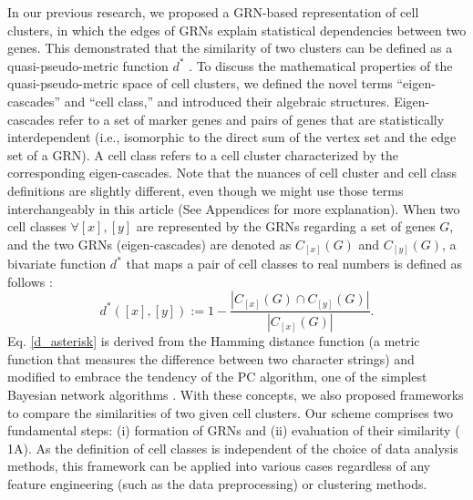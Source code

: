 \documentclass{article}
\begin{document}
In our previous research, we proposed a \ac{GRN}-based representation of cell clusters, in 
which the edges of GRNs explain statistical dependencies between two genes. This demonstrated that the similarity 
of two clusters can be defined as a quasi-pseudo-metric function $d^*$ \cite{okano2023set}. To discuss the mathematical properties of 
the quasi-pseudo-metric space of cell clusters, we defined the novel terms ``eigen-cascades'' and ``cell class,'' and 
introduced their algebraic structures. Eigen-cascades refer to a set of marker genes and pairs of genes that are 
statistically interdependent (i.e., isomorphic to the direct sum of the vertex set and the edge set of a GRN). A 
cell class refers to a cell cluster characterized by the corresponding eigen-cascades. Note that the nuances of cell 
cluster and cell class definitions are slightly different, even though we might use those terms interchangeably in this article 
(See Appendices for more explanation). When two cell classes $\forall[x], [y]$ are represented by the GRNs regarding a 
set of genes $G$, and the two GRNs (eigen-cascades) are denoted as $C_{[x]}(G)$ and $C_{[y]}(G)$, a bivariate function $d^*$ 
that maps a pair of cell classes to real numbers is defined as follows \cite{okano2023set}:
\begin{equation}\label{d_asterisk}
  d^*([x], [y]) := 1 - \frac{|C_{[x]}(G)\cap C_{[y]}(G)|}{|C_{[x]}(G)|}.
\end{equation}
Eq. \eqref{d_asterisk} is derived from the Hamming distance function (a metric function that measures the difference between 
two character strings) and modified to embrace the tendency of the \ac{PC} algorithm, one of the 
simplest Bayesian network algorithms \cite{okano2023set,bookstein2002generalized, spirtes2000causation}. With these concepts, we also proposed frameworks to compare 
the similarities of two given cell clusters. Our scheme comprises two fundamental steps: (i) formation of GRNs and (ii) 
evaluation of their similarity (\figurename{ 1A}). As the definition of cell classes is independent of the choice of data 
analysis methods, this framework can be applied into various cases regardless of any feature engineering (such as 
the data preprocessing) or clustering methods.
\end{document}
